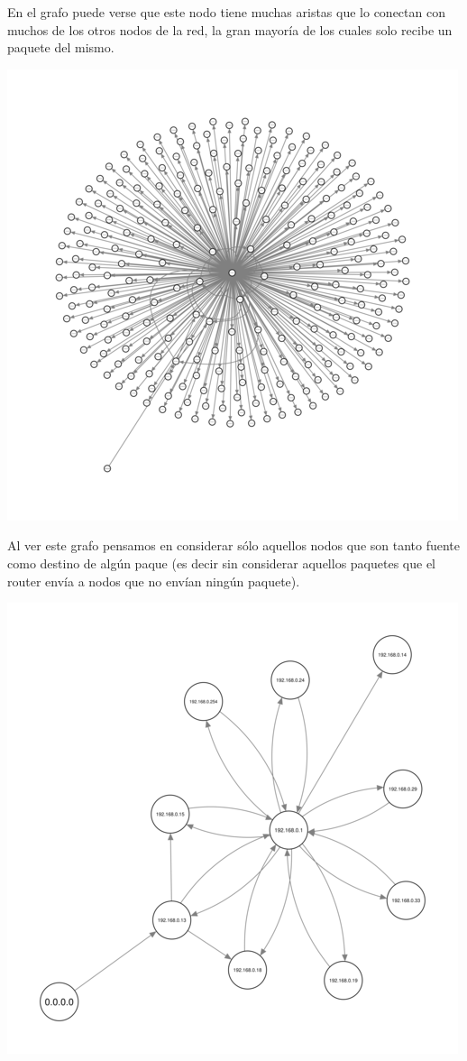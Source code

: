 En el grafo puede verse que este nodo tiene muchas aristas que lo
conectan con muchos de los otros nodos de la red, la gran mayoría de
los cuales solo recibe un paquete del mismo.

\includegraphics[scale=0.6]{../img/eric-lavarropas.png}

Al ver este grafo pensamos en considerar sólo aquellos nodos que son
tanto fuente como destino de algún paque (es decir sin considerar
aquellos paquetes que el router envía a nodos que no envían ningún
paquete).

\includegraphics[scale=0.6]{../img/eric-flor.png}

